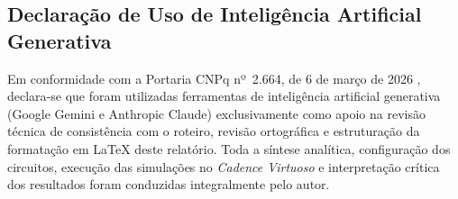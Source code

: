 \subsection*{Declaração de Uso de Inteligência Artificial Generativa}

Em conformidade com a Portaria CNPq nº~2.664, de 6 de março de 2026 \cite{cnpq_integridade}, declara-se que foram utilizadas ferramentas de inteligência artificial generativa (Google Gemini e Anthropic Claude) exclusivamente como apoio na revisão técnica de consistência com o roteiro, revisão ortográfica e estruturação da formatação em \LaTeX{} deste relatório. Toda a síntese analítica, configuração dos circuitos, execução das simulações no \textit{Cadence Virtuoso} e interpretação crítica dos resultados foram conduzidas integralmente pelo autor.